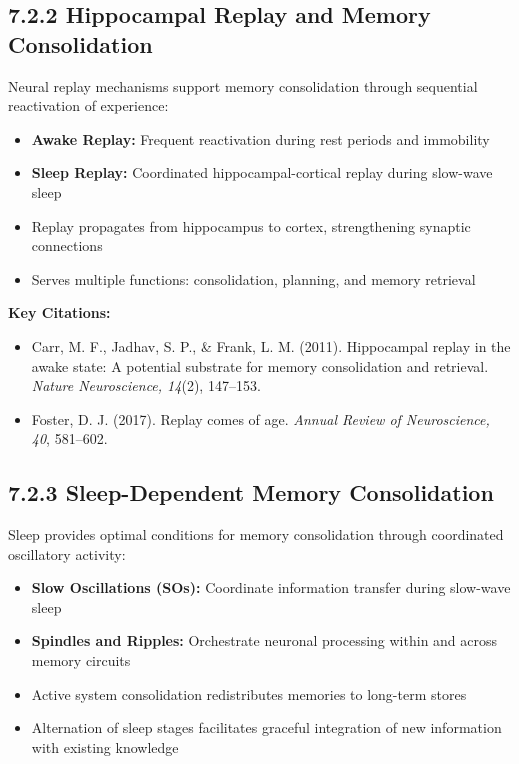 \documentclass[11pt,letterpaper]{article}
\begin{document}
\subsection{7.2.2 Hippocampal Replay and Memory Consolidation}

Neural replay mechanisms support memory consolidation through sequential reactivation of experience:

\begin{itemize}[leftmargin=*]
    \item \textbf{Awake Replay:} Frequent reactivation during rest periods and immobility
    \item \textbf{Sleep Replay:} Coordinated hippocampal-cortical replay during slow-wave sleep
    \item Replay propagates from hippocampus to cortex, strengthening synaptic connections
    \item Serves multiple functions: consolidation, planning, and memory retrieval
\end{itemize}

\textbf{Key Citations:}
\begin{itemize}[leftmargin=*]
    \item Carr, M. F., Jadhav, S. P., \& Frank, L. M. (2011). Hippocampal replay in the awake state: A potential substrate for memory consolidation and retrieval. \textit{Nature Neuroscience, 14}(2), 147--153.
    \item Foster, D. J. (2017). Replay comes of age. \textit{Annual Review of Neuroscience, 40}, 581--602.
\end{itemize}

\subsection{7.2.3 Sleep-Dependent Memory Consolidation}

Sleep provides optimal conditions for memory consolidation through coordinated oscillatory activity:

\begin{itemize}[leftmargin=*]
    \item \textbf{Slow Oscillations (SOs):} Coordinate information transfer during slow-wave sleep
    \item \textbf{Spindles and Ripples:} Orchestrate neuronal processing within and across memory circuits
    \item Active system consolidation redistributes memories to long-term stores
    \item Alternation of sleep stages facilitates graceful integration of new information with existing knowledge
\end{itemize}
\end{document}
